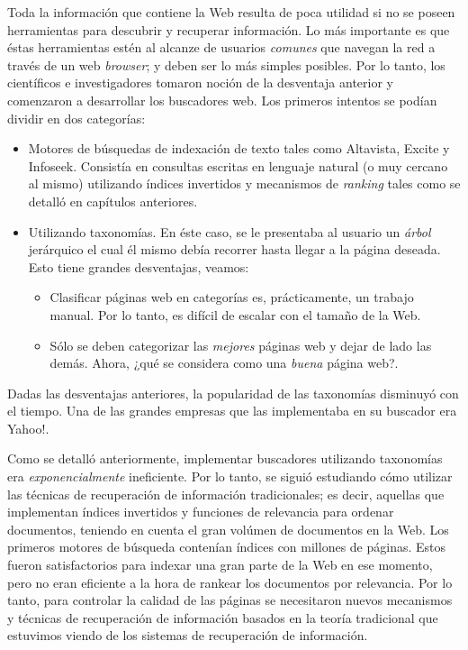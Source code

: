 	Toda la información que contiene la Web resulta de poca utilidad si no se poseen herramientas para descubrir y recuperar información. Lo más importante es que éstas herramientas estén al alcanze de usuarios \textit{comunes} que navegan la red a través de un web \textit{browser}; y deben ser lo más simples posibles. Por lo tanto, los científicos e investigadores tomaron noción de la desventaja anterior y comenzaron a desarrollar los buscadores web. Los primeros intentos se podían dividir en dos categorías:
	\begin{itemize}
		\item Motores de búsquedas de indexación de texto tales como Altavista, Excite y Infoseek. Consistía en consultas escritas en lenguaje natural (o muy cercano al mismo) utilizando índices invertidos y mecanismos de \textit{ranking} tales como se detalló en capítulos anteriores.
		\item Utilizando taxonomías. En éste caso, se le presentaba al usuario un \textit{árbol} jerárquico el cual él mismo debía recorrer hasta llegar a la página deseada. Esto tiene grandes desventajas, veamos:
			\begin{itemize}
				\item Clasificar páginas web en categorías es, prácticamente, un trabajo manual. Por lo tanto, es difícil de escalar con el tamaño de la Web.
				\item Sólo se deben categorizar las \textit{mejores} páginas web y dejar de lado las demás. Ahora, ¿qué se considera como una \textit{buena} página web?.
			\end{itemize}
	\end{itemize}
	Dadas las desventajas anteriores, la popularidad de las taxonomías disminuyó con el tiempo. Una de las grandes empresas que las implementaba en su buscador era Yahoo!. \par
	
	Como se detalló anteriormente, implementar buscadores utilizando taxonomías era \textit{exponencialmente} ineficiente. Por lo tanto, se siguió estudiando cómo utilizar las técnicas de recuperación de información tradicionales; es decir, aquellas que implementan índices invertidos y funciones de relevancia para ordenar documentos, teniendo en cuenta el gran volúmen de documentos en la Web. Los primeros motores de búsqueda contenían índices con millones de páginas. Estos fueron satisfactorios para indexar una gran parte de la Web en ese momento, pero no eran eficiente a la hora de rankear los documentos por relevancia. Por lo tanto, para controlar la calidad de las páginas se necesitaron nuevos mecanismos y técnicas de recuperación de información basados en la teoría tradicional que estuvimos viendo de los sistemas de recuperación de información.
	
